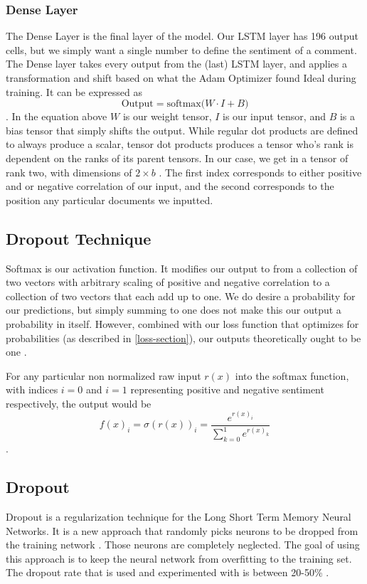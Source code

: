 \documentclass[titlepage,letterpaper]{article}
\begin{document}
\subsubsection{Dense Layer}
The Dense Layer is the final layer of the model. Our LSTM layer has 196 output cells, but we simply want a single number to define the sentiment of a comment.  The Dense layer takes every output from the (last) LSTM layer, and applies a transformation and shift based on what the Adam Optimizer found Ideal during training. It can be expressed as
\[ \text{Output} = \text{softmax(} W \cdot I + B ) \].
In the equation above \(W\) is our weight tensor, \(I\) is our input tensor, and \(B\) is a bias tensor that simply shifts the output. While regular dot products are defined to always produce a scalar, tensor dot products produces a tensor who's rank is dependent on the ranks of its parent tensors. In our case, we get in a tensor of rank two, with dimensions of \(2\times b\) . The first index corresponds to either positive and or negative correlation of our input, and the second corresponds to the position any particular documents we inputted. \cite{tensors, tensorflow}

\subsection{Dropout Technique}

Softmax is our activation function. It modifies our output to from a collection of two vectors  with arbitrary scaling of positive and negative correlation to a collection of two vectors that each add up to one. We do desire a probability for our predictions, but simply summing to one does not make this our output a probability in itself. However, combined with our loss function that optimizes for probabilities (as described in \cref{loss-section}), our outputs theoretically ought to  be one \cite{NeuralNet,tensorflow}.

For any particular non normalized raw input \(r(x)\)  into the softmax function, with indices \(i=0\)  and \(i=1\) representing positive and negative sentiment respectively, the output would be \cite{NeuralNet}
\[f(x)_i = \sigma(r(x))_i  = \frac{e^{r(x)_i}}{\sum_{k=0}^1 e^{r (x)_k}}\].
\subsection{Dropout}
Dropout is a regularization technique for the Long Short Term Memory Neural Networks. It is a new approach that randomly picks neurons to be dropped from the training network \cite{NeuralNet}. Those neurons are completely neglected. The goal of using this approach is to keep the neural network from overfitting to the training set. The dropout rate that is used and experimented with is between 20-50\% \cite{NeuralNet}.
\end{document}
